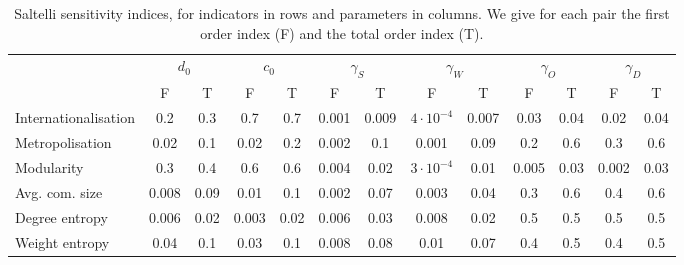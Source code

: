 \begin{table}[h!]
\begin{adjustwidth}{-2.25in}{0in}
\caption{Saltelli sensitivity indices, for indicators in rows and parameters in columns. We give for each pair the first order index (F) and the total order index (T).\label{tab:saltelli}}
\hspace{-1cm}\begin{tabular}{|l|c|c|c|c|c|c|c|c|c|c|c|c|}
\hline
 & \multicolumn{2}{|c|}{$d_0$} & \multicolumn{2}{|c|}{$c_0$} & \multicolumn{2}{|c|}{$\gamma_S$} & \multicolumn{2}{|c|}{$\gamma_W$} & \multicolumn{2}{|c|}{$\gamma_O$} & \multicolumn{2}{|c|}{$\gamma_D$} \\
 & F & T & F & T & F & T & F & T & F & T & F & T \\
 \hline
Internationalisation & 0.2 & 0.3 & 0.7 & 0.7 & 0.001 & 0.009 & $4\cdot 10^{-4}$ & 0.007 & 0.03 & 0.04 & 0.02 & 0.04 \\
Metropolisation & 0.02 & 0.1 & 0.02 & 0.2 & 0.002 & 0.1 & 0.001 & 0.09 & 0.2 & 0.6 & 0.3 & 0.6 \\
Modularity & 0.3 & 0.4 & 0.6 & 0.6 & 0.004 & 0.02 & $3\cdot 10^{-4}$ & 0.01 & 0.005 & 0.03 & 0.002 & 0.03 \\
Avg. com. size & 0.008 & 0.09 & 0.01 & 0.1 & 0.002 & 0.07 & 0.003 & 0.04 & 0.3 & 0.6 & 0.4 & 0.6 \\
Degree entropy & 0.006 & 0.02 & 0.003 & 0.02 & 0.006 & 0.03 & 0.008 & 0.02 & 0.5 & 0.5 & 0.5 & 0.5 \\
Weight entropy & 0.04 & 0.1 & 0.03 & 0.1 & 0.008 & 0.08 & 0.01 & 0.07 & 0.4 & 0.5 & 0.4 & 0.5 \\\hline
\end{tabular}
\end{adjustwidth}
\end{table}





